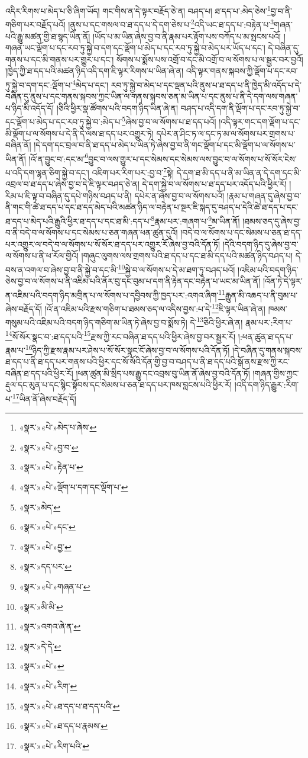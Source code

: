 འདིར་རིགས་པ་མེད་པ་ཅི་ཞིག་ཡོད། གང་གིས་ན་དེ་ལྟར་བརྗོད་ཅེ་ན། བཤད་པ། ཐ་དད་པ་:མེད་ཅེས་\footnote{«སྣར་»«པེ་»མེད་པ་ཞེས་}བྱ་བ་ནི་གཅིག་པར་བརྗོད་པའོ། །ནུས་པ་དང་གསལ་བ་ཐ་དད་པ་དེ་དག་ཅེས་པ་\footnote{«སྣར་»«པེ་»བྱ་བ་}འདི་ཡང་ཐ་དད་པ་:བརྟེན་པ་\footnote{«སྣར་»«པེ་»རྟེན་པ་}གཞན་པའི་རྒྱུ་མཚན་གྱི་ཐ་སྙད་ཡིན་ནོ། །ཡོད་པ་མ་ཡིན་ཞེས་བྱ་བ་ནི་རྣམ་པར་རྟོག་པས་བཀོད་པ་མ་སྤངས་པའོ། །གཞན་ཡང་ལྡོག་པ་དང་རབ་ཏུ་སྐྱེ་བ་དག་དང་ལྡོག་པ་མེད་པ་དང་རབ་ཏུ་སྐྱེ་བ་མེད་པར་ཡོད་པ་དང་། དེ་བཞིན་དུ་གནས་པ་དང་མི་གནས་པར་གྱུར་པ་དང་། སོགས་པ་སྨོས་པས་འགྲོ་བ་དང་མི་འགྲོ་བ་ལ་སོགས་པ་ལ་སྦྱར་བར་བྱའོ། །ཁྱེད་ཀྱི་ཐ་དད་པའི་མཚན་ཉིད་འདི་དག་ཇི་ལྟར་རིགས་པ་ཡིན་ཞེ་ན། འདི་ལྟར་གནས་སྐབས་ཀྱི་ལྡོག་པ་དང་རབ་ཏུ་སྐྱེ་བ་དག་དང་:ལྡོག་པ་\footnote{«སྣར་»«པེ་»ལྡོག་པ་དག་དང་ལྡོག་པ་}མེད་པ་དང་། རབ་ཏུ་སྐྱེ་བ་མེད་པ་དང་ལྡན་པའི་ནུས་པ་ཐ་དད་པ་ནི་ཁྱེད་མི་འདོད་པ་དེ་བཞིན་དུ་ནུས་པ་དང་གནས་སྐབས་ཀྱང་ཡིན་ལ་གནས་སྐབས་ཅན་མ་ཡིན་པ་དང་ནུས་པ་ནི་དེ་དག་ལས་གཞན་པ་ཉིད་མི་འདོད་དོ། །ཅིའི་ཕྱིར་སྣ་ཚོགས་པའི་བདག་ཉིད་ཡིན་ཞེ་ན། བཤད་པ་འདི་དག་ནི་ལྡོག་པ་དང་རབ་ཏུ་སྐྱེ་བ་དང་ལྡོག་པ་མེད་པ་དང་རབ་ཏུ་སྐྱེ་བ་:མེད་པ་\footnote{«སྣར་»མེད་}ཞེས་བྱ་བ་ལ་སོགས་པ་ཐ་དད་པའོ། །འདི་ལྟར་གང་དག་ལྡོག་པ་དང་མི་ལྡོག་པ་ལ་སོགས་པ་དེ་ནི་དེ་ལས་ཐ་དད་པར་འགྱུར་ཏེ། དཔེར་ན་ཤིང་ཏ་ལ་དང་ཏ་མ་ལ་སོགས་པར་གྲགས་པ་བཞིན་ནོ། །དེ་དག་དང་བྲལ་བ་ནི་ཐ་དད་པ་མེད་པ་ཡིན་ཏེ་ཞེས་བྱ་བ་ནི་གང་ལྡོག་པ་དང་མི་ལྡོག་པ་ལ་སོགས་པ་ཡིན་ནོ། །འོ་ན་བྱུང་བ་:དང་མ་\footnote{«སྣར་»«པེ་»དང་}བྱུང་བ་ལས་གྱུར་པ་དང་སེམས་དང་སེམས་ལས་བྱུང་བ་ལ་སོགས་པ་སོ་སོར་ངེས་པ་འདི་དག་ལྷན་ཅིག་སྐྱེ་བ་དང་། འཇིག་པར་རིག་པར་:བྱ་བ་\footnote{«སྣར་»«པེ་»བྱ་}སྟེ། དེ་དག་ཐ་མི་དད་པ་ནི་མ་ཡིན་ན་དེ་དག་དང་མི་འབྲལ་བ་ཐ་དད་པ་ཞེས་བྱ་བ་དེ་ཇི་ལྟར་བཤད་ཅེ་ན། དེ་དག་སྐྱེ་བ་ལ་སོགས་པ་ཐ་དད་པར་འདོད་པའི་ཕྱིར་རོ། །རིམ་པ་ཇི་ལྟ་བ་བཞིན་དུ་དཔེ་གཉིས་བཤད་པ་ནི། དཔེར་ན་ཞེས་བྱ་བ་ལ་སོགས་པའོ། །རྣམ་པ་གཞན་དུ་ཞེས་བྱ་བ་ནི་གང་གི་ཚེ་ཐ་དད་པ་དང་ཐ་དད་མེད་པའི་མཚན་ཉིད་ལ་བརྟེན་པ་སྔར་ཇི་སྐད་དུ་བཤད་པ་དེའི་ཚེ་ཐ་དད་པ་དང་ཐ་དད་པ་མེད་པའི་རྒྱུའི་ཕྱིར་ཐ་དད་པ་དང་ཐ་མི་:དད་པ་\footnote{«སྣར་»དད་པར་}རྣམ་པར་:གཞག་པ་\footnote{«སྣར་»«པེ་»གཞན་པ་}མ་ཡིན་ནོ། །ཐམས་ཅད་དུ་ཞེས་བྱ་བ་ནི་བདེ་བ་ལ་སོགས་པ་དང་སེམས་པ་ཅན་གཞན་ཕན་ཚུན་དུའོ། །བདེ་བ་ལ་སོགས་པ་དང་སེམས་པ་ཅན་ཐ་དད་པར་འགྱུར་ལ་བདེ་བ་ལ་སོགས་པ་སོ་སོར་ཐ་དད་པར་འགྱུར་རོ་ཞེས་བྱ་བའི་དོན་ཏོ། །དེའི་བདག་ཉིད་དུ་ཞེས་བྱ་བ་ལ་སོགས་པ་ནི་ཕ་རོལ་གྱིའོ། །གཞུང་ལུགས་ལས་གྲགས་པའི་ཐ་དད་པ་དང་ཐ་མི་དད་པའི་མཚན་ཉིད་བཤད་པ། དེ་བས་ན་འགལ་བ་ཞེས་བྱ་བ་ནི་སྐྱེ་བ་དང་མི་\footnote{«སྣར་»མི་མི་}སྐྱེ་བ་ལ་སོགས་པ་དེ་མ་ཐག་ཏུ་བཤད་པའོ། །འཇིམ་པའི་བདག་ཉིད་ཅེས་བྱ་བ་ལ་སོགས་པ་ནི་འཇིམ་པའི་ནོར་བུ་དང་བུམ་པ་དག་ནི་རྟེན་དང་བརྟེན་པ་ཡང་མ་ཡིན་ནོ། །འོན་ཏེ་དེ་ལྟར་ན་འཇིམ་པའི་བདག་ཉིད་མགྲིན་པ་ལ་སོགས་པ་དབྱིབས་ཀྱི་ཁྱད་པར་:འགའ་ཞིག་\footnote{«སྣར་»འགའ་ཞེ་ན་}རྒྱུན་མི་འཆད་པ་ནི་བུམ་པ་ཞེས་བརྗོད་དོ། །འོ་ན་འཇིམ་པའི་རྫས་གཅིག་པ་ཐམས་ཅད་ལ་འདིས་བྱས་:པ་དེ་\footnote{«སྣར་»དེ་དེ་}ཇི་ལྟར་ཡིན་ཞེ་ན། ཁམས་གསུམ་པའི་འཇིམ་པའི་བདག་ཉིད་གཅིག་མ་ཡིན་ཏེ་ཞེས་བྱ་བ་སྨོས་ཏེ། དེ་\footnote{«སྣར་»«པེ་»}ཅིའི་ཕྱིར་ཞེ་ན། རྣམ་པར་:རིག་པ་\footnote{«སྣར་»«པེ་»རིག་}སོ་སོར་སྣང་བ་:ཐ་དད་པའི་\footnote{«སྣར་»«པེ་»ཐ་དད་པ་ཐ་དད་པའི་}རྫས་ཀྱི་རང་བཞིན་ཐ་དད་པའི་ཕྱིར་ཞེས་བྱ་བར་སྦྱར་རོ། །:ཕན་ཚུན་ཐ་དད་པ་རྣམ་པ་\footnote{«སྣར་»«པེ་»ཐ་དད་པ་རྣམས་}ཉིད་ཀྱི་རྫས་རྣམ་པར་ཤེས་པ་སོ་སོར་སྣང་ངོ་ཞེས་བྱ་བ་ལ་སོགས་པའི་དོན་ཏོ། །དེ་བཞིན་དུ་གནས་སྐབས་ཐ་དད་པ་ནི་ཐ་དད་པར་གནས་པའི་ཕྱིར་དང་སོ་སོའི་དོན་གྱི་བྱ་བ་བཤད་པ་ནི་ཐ་དད་པའི་སྒོ་ནས་རྫས་ཀྱི་རང་བཞིན་ཐ་དད་པའི་ཕྱིར་རོ། །ཕན་ཚུན་མི་སྲིད་པས་རྒྱུ་དང་འབྲས་བུ་ཡིན་ནོ་ཞེས་བྱ་བའི་དོན་ཏོ། །གཞན་གྱིས་ཀྱང་རྡུལ་དང་མུན་པ་དང་སྙིང་སྟོབས་དང་སེམས་པ་ཅན་ཐ་དད་པར་ཁས་བླངས་པའི་ཕྱིར་རོ། །འདི་དག་ཉིད་རྒྱུར་:རིག་པ་\footnote{«སྣར་»«པེ་»རིག་པའི་}ཡིན་ནོ་ཞེས་བརྗོད་དོ། 
